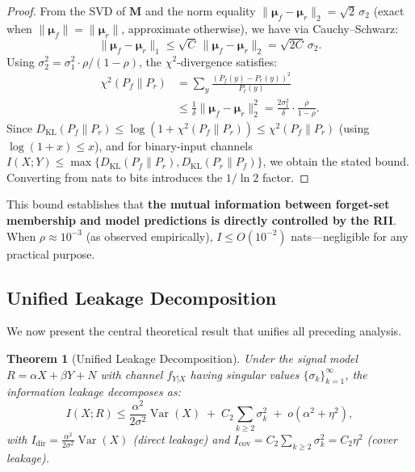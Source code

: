 \documentclass[journal]{IEEEtran}
\newtheorem{theorem}{Theorem}[section]
\theoremstyle{definition}
\begin{document}
\begin{proof}
From the SVD of $\mathbf{M}$ and the norm equality $\|\boldsymbol{\mu}_f - \boldsymbol{\mu}_r\|_2 = \sqrt{2}\,\sigma_2$ (exact when $\|\boldsymbol{\mu}_f\| = \|\boldsymbol{\mu}_r\|$, approximate otherwise), we have via Cauchy--Schwarz:
\begin{equation}
\|\boldsymbol{\mu}_f - \boldsymbol{\mu}_r\|_1 \le \sqrt{C}\,\|\boldsymbol{\mu}_f - \boldsymbol{\mu}_r\|_2 = \sqrt{2C}\,\sigma_2.
\end{equation}
Using $\sigma_2^2 = \sigma_1^2 \cdot \rho/(1-\rho)$, the $\chi^2$-divergence satisfies:
\begin{equation}
\begin{aligned}
\chi^2(P_f\|P_r)
&= \sum_{y} \frac{(P_f(y)-P_r(y))^2}{P_r(y)} \\
&\le \frac{1}{\delta}\|\boldsymbol{\mu}_f - \boldsymbol{\mu}_r\|_2^2
= \frac{2\sigma_1^2}{\delta} \cdot \frac{\rho}{1-\rho}.
\end{aligned}
\end{equation}
Since $D_{\mathrm{KL}}(P_f\|P_r) \le \log(1 + \chi^2(P_f\|P_r)) \le \chi^2(P_f\|P_r)$ (using $\log(1+x) \le x$), and for binary-input channels $I(X;Y) \le \max\{D_{\mathrm{KL}}(P_f\|P_r), D_{\mathrm{KL}}(P_r\|P_f)\}$, we obtain the stated bound. Converting from nats to bits introduces the $1/\ln 2$ factor.
\end{proof}

This bound establishes that \textbf{the mutual information between forget-set membership and model predictions is directly controlled by the RII}. When $\rho \approx 10^{-3}$ (as observed empirically), $I \le O(10^{-2})$ nats---negligible for any practical purpose.

\subsection{Unified Leakage Decomposition}

We now present the central theoretical result that unifies all preceding analysis.

\begin{theorem}[Unified Leakage Decomposition]
\label{thm:unified}
Under the signal model $R = \alpha X + \beta Y + N$ with channel $f_{Y|X}$ having singular values $\{\sigma_k\}_{k=1}^\infty$, the information leakage decomposes as:
\begin{equation}
\boxed{I(X; R) \le
\frac{\alpha^2}{2\sigma^2}\operatorname{Var}(X)
\;+\;
C_2\!\sum_{k\ge 2}\sigma_k^2
\;+\; o(\alpha^2 + \eta^2),}
\label{eq:unified}
\end{equation}
with $I_{\mathrm{dir}} = \frac{\alpha^2}{2\sigma^2}\operatorname{Var}(X)$ (direct leakage) and
$I_{\mathrm{cov}} = C_2\sum_{k\ge 2}\sigma_k^2 = C_2\eta^2$ (cover leakage).
\end{theorem}
\end{document}
